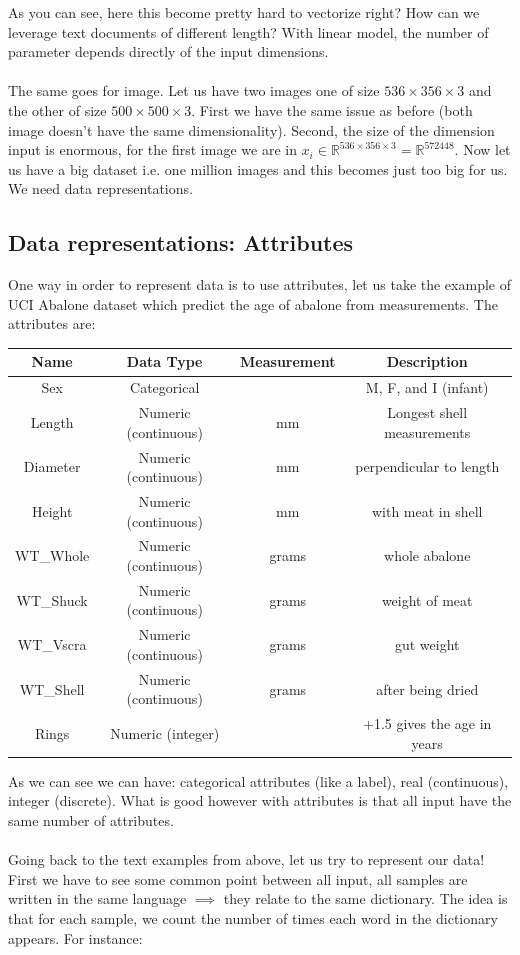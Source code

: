 	As you can see, here this become pretty hard to vectorize right? How can we leverage text documents of different length? With linear model, the number of parameter depends directly of the input dimensions.\\
	$ $\\
	The same goes for image. Let us have two images one of size $536 \times 356 \times 3$ and the other of size $500 \times 500 \times 3$. First we have the same issue as before (both image doesn't have the same dimensionality). Second, the size of the dimension input is enormous, for the first image we are in $x_i \in \mathbb{R}^{536 \times 356 \times 3} = \mathbb{R}^{572448}$. Now let us have a big dataset i.e. one million images and this becomes just too big for us. We need data representations.
	

\subsection{Data representations: Attributes}
One way in order to represent data is to use attributes, let us take the example of UCI Abalone dataset which predict the age of abalone from measurements. The attributes are:
\begin{center}
\begin{tabular}{|c|c|c|c|}
	\hline
	Name & Data Type & Measurement & Description \\
	\hline
	Sex & Categorical & & M, F, and I (infant) \\
	\hline
	Length & Numeric (continuous) & mm &  Longest shell measurements\\
	\hline
	Diameter & Numeric (continuous) & mm &  perpendicular to length\\
	\hline
	Height & Numeric (continuous) & mm &  with meat in shell\\
	\hline
	WT\_Whole & Numeric (continuous) & grams &  whole abalone\\
	\hline
	WT\_Shuck & Numeric (continuous) & grams &  weight of meat\\
	\hline
	WT\_Vscra & Numeric (continuous) & grams &  gut weight\\
	\hline
	WT\_Shell & Numeric (continuous) & grams &  after being dried\\
	\hline
	Rings & Numeric (integer) &  & +1.5 gives the age in years \\
	\hline
\end{tabular}
\end{center}
As we can see we can have: categorical attributes (like a label), real (continuous), integer (discrete). What is good however with attributes is that all input have the same number of attributes.\\
$ $\\
Going back to the text examples from above, let us try to represent our data! First we have to see some common point between all input, all samples are written in the same language $\implies$ they relate to the same dictionary. The idea is that for each sample, we count the number of times each word in the dictionary appears. For instance:

